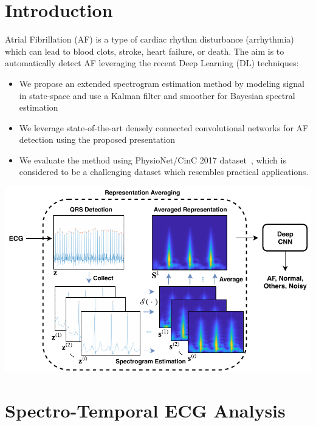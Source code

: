 \documentclass[portrait,a0,final]{a0poster} %
\newcommand{\sectionspace}{10mm} %
\begin{document}
\begin{minipage}{0.98\linewidth}




\begin{minipage}[t]{0.47\linewidth}
\setlength{\parindent}{10mm} %


\section{Introduction}
\Large
Atrial Fibrillation (AF) is a type of cardiac rhythm disturbance (arrhythmia) which can lead to blood clots, stroke, heart failure, or death. The aim is to automatically detect AF leveraging the recent Deep Learning (DL) techniques:
\vspace{10mm}
\begin{itemize}
	\item We propose an extended spectrogram estimation method by modeling signal in state-space and use a Kalman filter and smoother for Bayesian spectral estimation
	\item We leverage state-of-the-art densely connected convolutional networks \cite{huang2017densely} for AF detection using the proposed presentation
	\item We evaluate the method using PhysioNet/CinC 2017 dataset~\cite{clifford2017af}, which is considered to be a challenging dataset which resembles practical applications.
\end{itemize}
\begin{minipage}[c]{\linewidth}
	\centering
	\includegraphics[scale=2]{figures/pre-processing}
\end{minipage}


\vspace{\sectionspace}
\section{Spectro-Temporal ECG Analysis}


\end{minipage}
\end{minipage}
\end{document}
